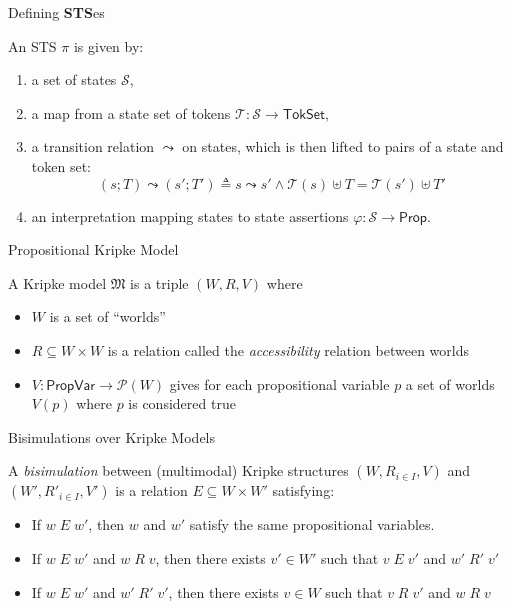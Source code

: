 \documentclass[aspectratio=169,xcolor=dvipsnames]{beamer}
\begin{document}
\begin{frame}{Defining \textbf{STS}es}\scriptsize
\begin{definition}
An STS $\pi$ is given by:
\begin{enumerate}
\item a set of states $\mathcal{S}$,
\item a map from a state set of tokens $\mathcal{T} : \mathcal{S} \rightarrow \mathsf{TokSet}$,
\item a transition relation $\leadsto$ on states, which is then lifted to pairs of a state and token set:
    \[(s;T)\leadsto(s';T') \triangleq s\leadsto s' \land \mathcal{T}(s)\uplus T = \mathcal{T}(s')\uplus T'\]
\item an interpretation mapping states to state assertions $\varphi :
    \mathcal{S}\rightarrow \mathsf{Prop}$.
    \end{enumerate}
\end{definition}
\end{frame}
\begin{frame}{Propositional Kripke Model}\scriptsize
     \begin{definition}
    A Kripke model $\mathfrak{M}$ is a triple $(W,R,V)$ where
    \begin{itemize}
        \item $W$ is a set of ``worlds''
        \item $R\subseteq W\times W$ is a relation called the \emph{accessibility} relation between worlds
        \item $V : \mathsf{PropVar} \rightarrow \mathcal{P}(W)$ gives for each propositional variable $p$ a set of worlds $V(p)$ where $p$ is considered true
    \end{itemize}
\end{definition}
\end{frame}
\begin{frame}{Bisimulations over Kripke Models}\scriptsize
\begin{definition}
    A \emph{bisimulation} between (multimodal) Kripke structures $(W,R_{i\in I},V)$ and $(W',R'_{i\in I},V')$ is a relation $E\subseteq W\times W'$ satisfying:
 \begin{itemize}
     \item If $w \; E \;w'$, then $w$ and $w'$ satisfy the same propositional variables.
     \item If $w \; E \;w'$ and $w \; R \; v$, then there exists $v'\in W'$ such that $v\;E\;v'$ and $w'\;R'\;v'$
       \item If $w \; E \;w'$ and $w'\;R'\;v'$, then there exists $v\in W$ such that $v\;R\;v'$ and $w\;R\;v$
    \end{itemize}   
\end{definition}
\end{frame}
\end{document}
